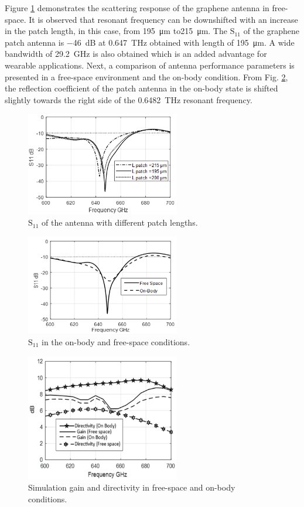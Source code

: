 \documentclass[12pt]{suhbook}
\begin{document}
Figure \ref{Fig 8AE} demonstrates the scattering response of the graphene antenna in free-space. It is observed that resonant frequency can be downshifted with an increase in the patch length, in this case, from \SI{195}{\um} to\SI{215}{\um}. The $\mathrm{S_{11}}$ of the graphene patch antenna is \SI{-46}{\dB} at \SI{0.647}{\THz} obtained with length of \SI{195}{\um}. A wide  bandwidth of \SI{29.2}{\GHz} is also obtained which is an added advantage for wearable applications. Next, a comparison of antenna performance parameters is presented in a free-space environment and the on-body condition. From Fig. \ref{Fig 8B}, the reflection coefficient of the patch antenna in the on-body state is shifted slightly towards the right side of the \SI{0.6482}{\THz} resonant frequency.
% 
\begin{figure}[hbt!]
    \centering
    \includegraphics[width=0.6\textwidth]{9}
    \caption{$\mathrm{S_{11}}$ of the antenna with different patch lengths.}
    \label{Fig 8AE}
\end{figure}
% 
\begin{figure}[hbt!]
    \centering
    \includegraphics[width=0.6\textwidth]{10}
    \caption{$\mathrm{S_{11}}$ in the on-body and free-space conditions.}
    \label{Fig 8B}
\end{figure}
% 
\begin{figure}[hbt!]
    \centering
    \includegraphics[width=0.6\textwidth]{11}
    \caption{Simulation gain and directivity in free-space and on-body conditions.}
    \label{Fig 8AA}
\end{figure}
\end{document}
